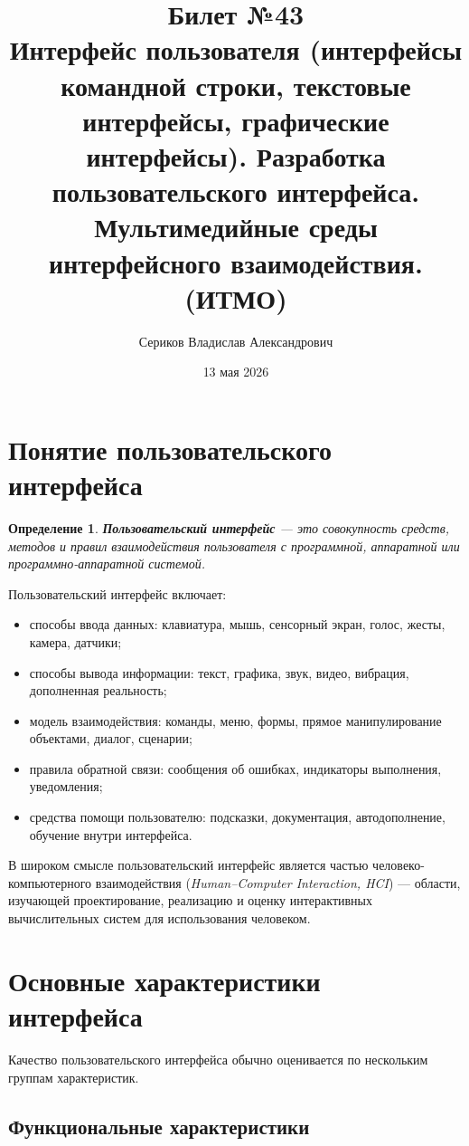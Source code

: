 \documentclass[12pt,a4paper]{article}
\title{Билет №43 \\ \small Интерфейс пользователя (интерфейсы командной строки, текстовые интерфейсы, графические интерфейсы). Разработка пользовательского интерфейса. Мультимедийные среды интерфейсного взаимодействия. (ИТМО)}
\author{Сериков Владислав Александрович}
\date{13 мая 2026}
\newtheorem{definition}{Определение}
\begin{document}
\maketitle
\tableofcontents
\newpage

\section{Понятие пользовательского интерфейса}

\begin{definition}
\textbf{Пользовательский интерфейс} --- это совокупность средств, методов и правил взаимодействия пользователя с программной, аппаратной или программно-аппаратной системой.
\end{definition}

Пользовательский интерфейс включает:
\begin{itemize}
    \item способы ввода данных: клавиатура, мышь, сенсорный экран, голос, жесты, камера, датчики;
    \item способы вывода информации: текст, графика, звук, видео, вибрация, дополненная реальность;
    \item модель взаимодействия: команды, меню, формы, прямое манипулирование объектами, диалог, сценарии;
    \item правила обратной связи: сообщения об ошибках, индикаторы выполнения, уведомления;
    \item средства помощи пользователю: подсказки, документация, автодополнение, обучение внутри интерфейса.
\end{itemize}

В широком смысле пользовательский интерфейс является частью человеко-компьютерного взаимодействия
(\textit{Human--Computer Interaction, HCI}) --- области, изучающей проектирование, реализацию и оценку интерактивных вычислительных систем для использования человеком.

\section{Основные характеристики интерфейса}

Качество пользовательского интерфейса обычно оценивается по нескольким группам характеристик.

\subsection{Функциональные характеристики}
\end{document}
